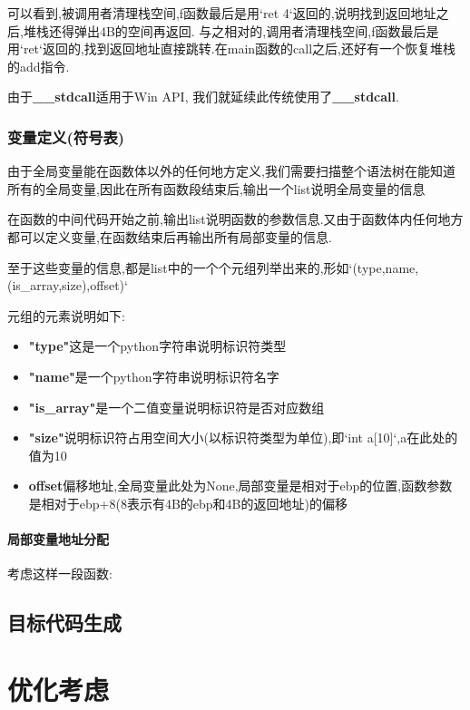 \documentclass{article}
\begin{document}
可以看到,被调用者清理栈空间,f函数最后是用`ret 4`返回的,说明找到返回地址之后,堆栈还得弹出4B的空间再返回.
与之相对的,调用者清理栈空间,f函数最后是用`ret`返回的,找到返回地址直接跳转.在main函数的call之后,还好有一个恢复堆栈的add指令.

由于\textbf{\_\_stdcall}适用于Win API, 我们就延续此传统使用了\textbf{\_\_stdcall}.

\subsubsection{变量定义(符号表)}

由于全局变量能在函数体以外的任何地方定义,我们需要扫描整个语法树在能知道所有的全局变量,因此在所有函数段结束后,输出一个list说明全局变量的信息


在函数的中间代码开始之前,输出list说明函数的参数信息.又由于函数体内任何地方都可以定义变量,在函数结束后再输出所有局部变量的信息.

至于这些变量的信息,都是list中的一个个元组列举出来的,形如`(type,name,(is\_array,size),offset)`

元组的元素说明如下:
\begin{itemize}
\item \textbf{"type"}这是一个python字符串说明标识符类型
\item \textbf{"name"}是一个python字符串说明标识符名字
\item \textbf{"is\_array"}是一个二值变量说明标识符是否对应数组
\item \textbf{"size"}说明标识符占用空间大小(以标识符类型为单位),即`int a[10]`,a在此处的值为10
\item \textbf{offset}偏移地址,全局变量此处为None,局部变量是相对于ebp的位置,函数参数是相对于ebp+8(8表示有4B的ebp和4B的返回地址)的偏移
\end{itemize}

\paragraph{局部变量地址分配}

考虑这样一段函数:


\subsection{目标代码生成}


\section{优化考虑}
\end{document}
